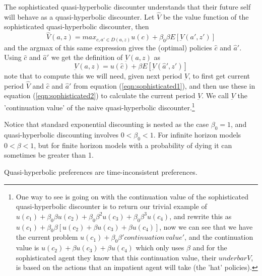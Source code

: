 The sophisticated quasi-hyperbolic discounter understands that their future self will behave as a quasi-hyperbolic discounter. Let $\hat{V}$ be the value function of the sophisticated quasi-hyperbolic discounter, then
\begin{equation} \label{eqn:sophisticated1}
    \hat{V}(a,z)=max_{c,a' \in D(a,z)} u(c)+\beta_0 \beta E[\underbar{V}(a',z')]
\end{equation}
and the argmax of this same expression gives the (optimal) policies $\hat{c}$ and $\hat{a}'$. Using $\hat{c}$ and $\hat{a}'$ we get the definition of $\underbar{V}(a,z)$ as
\begin{equation} \label{eqn:sophisticated2}
    \underbar{V}(a,z)= u(\hat{c})+\beta E[\underbar{V}(\hat{a}',z')]
\end{equation}
note that to compute this we will need, given next period $\underbar{V}$, to first get current period $\hat{V}$ and $\hat{c}$ and $\hat{a}'$ from equation (\ref{eqn:sophisticated1}), and then use these in equation (\ref{eqn:sophisticated2}) to calculate the current period $\underbar{V}$. We call $\underbar{V}$ the 'continuation value' of the naive quasi-hyperbolic discounter.\footnote{One way to see is going on with the continuation value of the sophisticated quasi-hyperbolic discounter is to return our trivial example of $u(c_1)+\beta_0 \beta u(c_2) +\beta_0  \beta^2 u(c_3)+ \beta_0 \beta^3 u(c_4)$, and rewrite this as $u(c_1)+\beta_0 \beta [u(c_2) +\beta u(c_3)+ \beta u(c_4)]$, now we can see that we have the current problem $u(c_1)+\beta_0 \beta 'continuation \, value'$, and the continuation value is $u(c_2) +\beta u(c_3)+ \beta u(c_4)$  which only uses $\beta$ and for the sophisticated agent they know that this continuation value, their $underbar{V}$, is based on the actions that an impatient agent will take (the 'hat' policies).}

Notice that standard exponential discounting is nested as the case $\beta_0=1$, and quasi-hyperbolic discounting involves $0<\beta_0<1$. For infinite horizon models $0<\beta<1$, but for finite horizon models with a probability of dying it can sometimes be greater than 1.

Quasi-hyperbolic preferences are time-inconsistent preferences.

